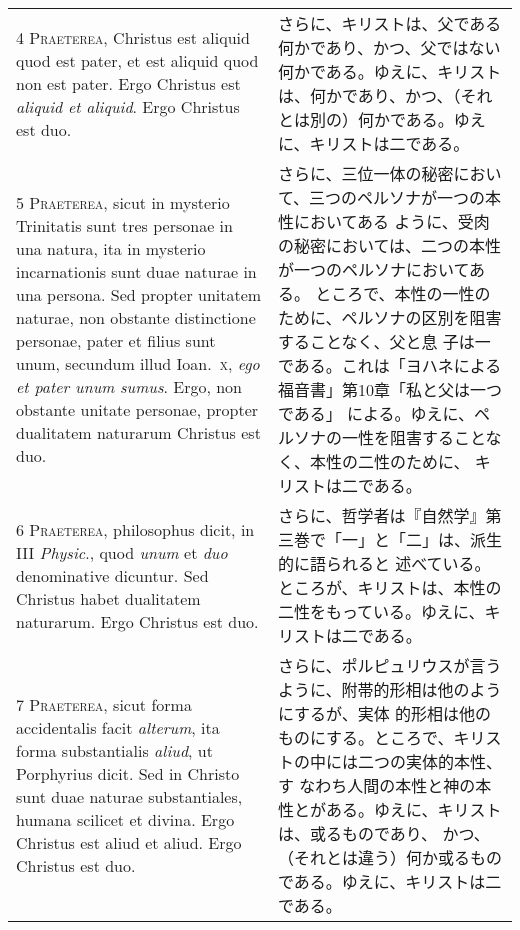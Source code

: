 \documentclass[10pt]{jsarticle} %
\begin{document}
\begin{longtable}{p{21em}p{21em}}
{\scshape 4 Praeterea}, Christus est aliquid quod est
 pater, et est aliquid quod non est pater. Ergo Christus est {\itshape aliquid et
 aliquid}. Ergo Christus est duo.


&

さらに、キリストは、父である何かであり、かつ、父ではない何かである。ゆえに、キリストは、何かであり、かつ、（それとは別の）何かである。ゆえに、キリストは二である。


\\


{\scshape 5 Praeterea}, sicut in mysterio Trinitatis
 sunt tres personae in una natura, ita in mysterio incarnationis sunt
 duae naturae in una persona. Sed propter unitatem naturae, non obstante
 distinctione personae, pater et filius sunt unum, secundum illud
 Ioan.~{\scshape x}, {\itshape ego et pater unum sumus}. Ergo, non obstante unitate personae,
 propter dualitatem naturarum Christus est duo.

&

さらに、三位一体の秘密において、三つのペルソナが一つの本性においてある
ように、受肉の秘密においては、二つの本性が一つのペルソナにおいてある。
ところで、本性の一性のために、ペルソナの区別を阻害することなく、父と息
子は一である。これは「ヨハネによる福音書」第10章「私と父は一つである」
による。ゆえに、ペルソナの一性を阻害することなく、本性の二性のために、
キリストは二である。



\\


{\scshape 6 Praeterea}, philosophus dicit, in III
 {\itshape Physic}., quod {\itshape unum} et {\itshape duo} denominative dicuntur. Sed Christus habet
 dualitatem naturarum. Ergo Christus est duo.


&

さらに、哲学者は『自然学』第三巻で「一」と「二」は、派生的に語られると
述べている。ところが、キリストは、本性の二性をもっている。ゆえに、キ
リストは二である。



\\


{\scshape 7 Praeterea}, sicut forma accidentalis facit
 {\itshape alterum}, ita forma substantialis {\itshape aliud}, ut Porphyrius dicit. Sed in
 Christo sunt duae naturae substantiales, humana scilicet et
 divina. Ergo Christus est aliud et aliud. Ergo Christus est duo.


&


さらに、ポルピュリウスが言うように、附帯的形相は他のようにするが、実体
的形相は他のものにする。ところで、キリストの中には二つの実体的本性、す
なわち人間の本性と神の本性とがある。ゆえに、キリストは、或るものであり、
かつ、（それとは違う）何か或るものである。ゆえに、キリストは二である。


\end{longtable}
\end{document}
